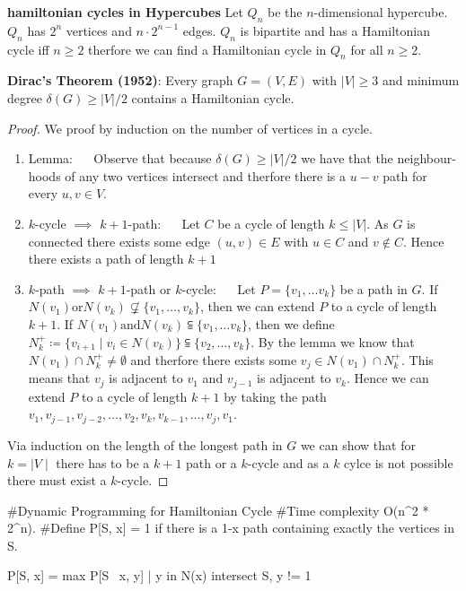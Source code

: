 \begin{example}
	\textbf{hamiltonian cycles in Hypercubes} Let $Q_n$ be the $n$-dimensional hypercube. $Q_n$ has $2^n$ vertices and $n \cdot 2^{n-1}$ edges.
	$Q_n$ is bipartite and has a Hamiltonian cycle iff $n \ge 2$ therfore we can find a Hamiltonian cycle in $Q_n$ for all $n \ge 2$.
\end{example}

\begin{theorem}
	\textbf{Dirac's Theorem (1952)}: Every graph $G = (V, E)$ with $|V| \ge 3$ and minimum degree $\delta(G) \ge |V|/2$ contains a Hamiltonian cycle.
\end{theorem}

\begin{proof}
	We proof by induction on the number of vertices in a cycle.
	\begin{enumerate}
		\item Lemma: $\quad$ Observe that because $\delta(G) \ge |V|/2$ we have that the neighbour-hoods of any two vertices intersect and therfore there is a $u-v$ path for every $u,v \in V$.
		\item $k$-cycle $\implies$ $k+1$-path: $\quad$ Let $C$ be a cycle of length $k \le |V|$. As $G$ is connected there exists some edge $(u,v) \in E$ with $u \in C$ and $v \notin C$. Hence there exists a path of length $k+1$
		\item $k$-path $\implies$ $k+1$-path or $k$-cycle: $\quad$ Let $P = \{v_1, \dots v_k\}$ be a path in $G$. If $N(v_1) \text{or} N(v_k) \not \subsetneq \{v_1, \dots, v_k\}$, then we can extend $P$ to a cycle of length $k+1$. If $N(v_1) \text{and} N(v_k) \subseteqq \{v_1, \dots v_k\}$, then we define $N_k^+ \coloneqq \{v_{i+1} \mid v_i \in N(v_k)\} \subseteqq \{v_2, \dots, v_k\}$. By the lemma we know that $N(v_1) \cap N_k^+ \neq \emptyset$ and therfore there exists some $v_j \in N(v_1) \cap N_k^+$. This means that $v_j$ is adjacent to $v_1$ and $v_{j-1}$ is adjacent to $v_k$. Hence we can extend $P$ to a cycle of length $k+1$ by taking the path $v_1, v_{j-1}, v_{j-2}, \dots, v_2, v_k, v_{k-1}, \dots, v_j, v_1$.
	\end{enumerate}
	Via induction on the length of the longest path in $G$ we can show that for $k=\mid V \mid$ there has to be a $k+1$ path or a $k$-cycle and as a $k$ cylce is not possible there must exist a $k$-cycle.
\end{proof}

\begin{algorithm}
	#Dynamic Programming for Hamiltonian Cycle
	#Time complexity O(n^2 * 2^n).
	#Define P[S, x] = 1 if there is a 1-x path containing exactly the vertices in S.

	P[S, x] = max { P[S \ {x}, y] | y in N(x) intersect S, y != 1 }
\end{algorithm}

